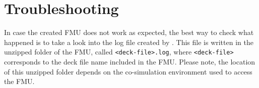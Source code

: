 \chapter{Troubleshooting}

In case the created FMU does not work as expected, the best way to check what happened is to take a look into the log file created by \trnsys.
This file is written in the unzipped folder of the FMU, called \texttt{<deck-file>.log}, where \texttt{<deck-file>} corresponds to the deck file name included in the FMU.
Please note, the location of this unzipped folder depends on the co-simulation environment used to access the FMU.
